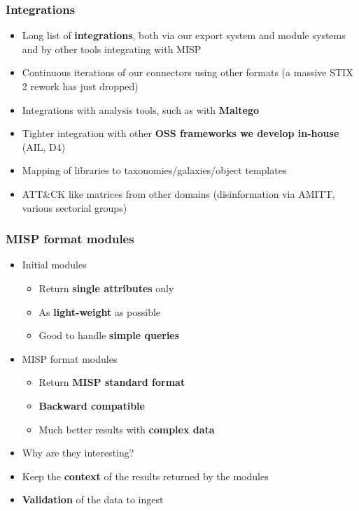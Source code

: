 \begin{frame}
\frametitle{Integrations}
\begin{itemize}
	\item Long list of {\bf integrations}, both via our export system and module systems and by other tools integrating with MISP
        \item Continuous iterations of our connectors using other formats (a massive STIX 2 rework has just dropped)
        \item Integrations with analysis tools, such as with {\bf Maltego}
        \item Tighter integration with other {\bf OSS frameworks we develop in-house} (AIL, D4)
        \item Mapping of libraries to taxonomies/galaxies/object templates
        \item ATT\&CK like matrices from other domains (disinformation via AMITT, various sectorial groups)
\end{itemize}
\end{frame}

\begin{frame}
\frametitle{MISP format modules}
\begin{itemize}
    \item Initial modules
    \begin{itemize}
        \item Return {\bf single attributes} only
        \item As {\bf light-weight} as possible
        \item Good to handle {\bf simple queries}
    \end{itemize}
    \item MISP format modules
    \begin{itemize}
        \item Return {\bf MISP standard format}
        \item {\bf Backward compatible}
        \item Much better results with {\bf complex data}
    \end{itemize}
\end{itemize}
\pause
\begin{itemize}
    \item Why are they interesting?
    \pause
    \item Keep the {\bf context} of the results returned by the modules
    \item {\bf Validation} of the data to ingest
\end{itemize}
\end{frame}

